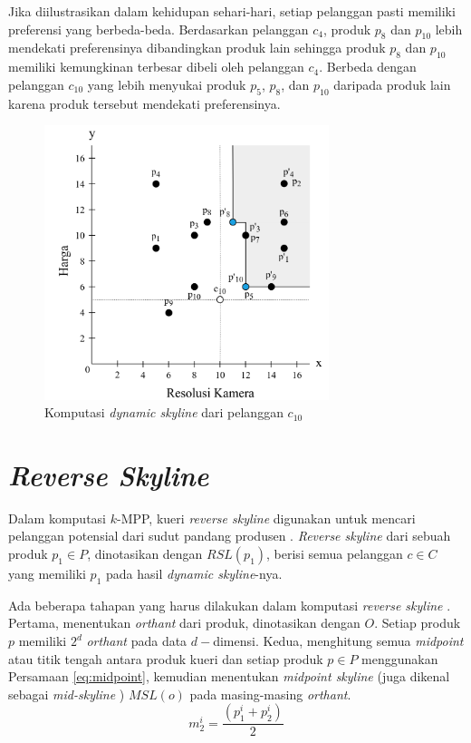 Jika diilustrasikan dalam kehidupan sehari-hari, setiap pelanggan pasti memiliki preferensi yang berbeda-beda. Berdasarkan pelanggan $c_4$, produk $p_8$ dan $p_{10}$ lebih mendekati preferensinya dibandingkan produk lain sehingga produk $p_8$ dan $p_{10}$ memiliki kemungkinan terbesar dibeli oleh pelanggan $c_4$. Berbeda dengan pelanggan $c_{10}$ yang lebih menyukai produk $p_5$, $p_8$, dan $p_{10}$ daripada produk lain karena produk tersebut mendekati preferensinya.

\begin{figure}[h]
	\centering
	\includegraphics[height=8cm]{assets/img/bab2/dsl-2.png}
	\caption{Komputasi \textit{dynamic skyline} dari pelanggan $c_{10}$}
	\label{fig:dsl-2}
\end{figure}

\section{\textit{Reverse Skyline}}
\tab Dalam komputasi $k$-MPP, kueri \textit{reverse skyline} digunakan untuk mencari pelanggan potensial dari sudut pandang produsen \cite{kmpp}. \textit{Reverse skyline} \cite{reverse-skyline} dari sebuah produk $p_1 \in
P$, dinotasikan dengan $RSL(p_1)$, berisi semua pelanggan $c \in C$ yang memiliki $p_1$ pada hasil \textit{dynamic skyline}-nya.

Ada beberapa tahapan yang harus dilakukan dalam komputasi \textit{reverse skyline} \cite{kmpp}. Pertama, menentukan \textit{orthant} dari produk, dinotasikan dengan $O$. Setiap produk $p$ memiliki $2^d$ \textit{orthant} pada data $d-$dimensi. Kedua, menghitung semua \textit{midpoint} atau titik tengah antara produk kueri dan setiap produk $p \in P$ menggunakan Persamaan \ref{eq:midpoint}, kemudian menentukan \textit{midpoint skyline} (juga dikenal sebagai \textit{mid-skyline} \cite{mid-skyline}) $MSL(o)$ pada masing-masing \textit{orthant}.
\begin{equation} \label{eq:midpoint}
m_2^i = \frac{(p_1^i + p_2^i)}{2}
\end{equation}

